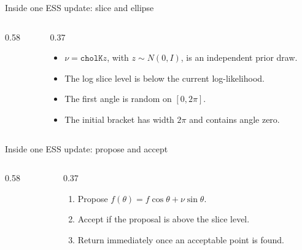 \documentclass[aspectratio=169,11pt]{beamer}
\begin{document}
\begin{frame}[fragile]{Inside one ESS update: slice and ellipse}
  \begin{columns}[T,totalwidth=\textwidth]
    \begin{column}{0.58\textwidth}
      
    \end{column}
    \begin{column}{0.37\textwidth}
      \begin{itemize}
        \setlength{\itemsep}{0.75em}
        \item \(\nu=\texttt{cholK}z\), with \(z\sim N(0,I)\), is an independent prior draw.
        \item The log slice level is below the current log-likelihood.
        \item The first angle is random on \([0,2\pi]\).
        \item The initial bracket has width \(2\pi\) and contains angle zero.
      \end{itemize}
    \end{column}
  \end{columns}
\end{frame}

\begin{frame}[fragile]{Inside one ESS update: propose and accept}
  \begin{columns}[T,totalwidth=\textwidth]
    \begin{column}{0.58\textwidth}
      
    \end{column}
    \begin{column}{0.37\textwidth}
      \begin{enumerate}
        \setlength{\itemsep}{0.6em}
        \item Propose \(f(\theta)=f\cos\theta+\nu\sin\theta\).
        \item Accept if the proposal is above the slice level.
        \item Return immediately once an acceptable point is found.
      \end{enumerate}
    \end{column}
  \end{columns}
\end{frame}
\end{document}
